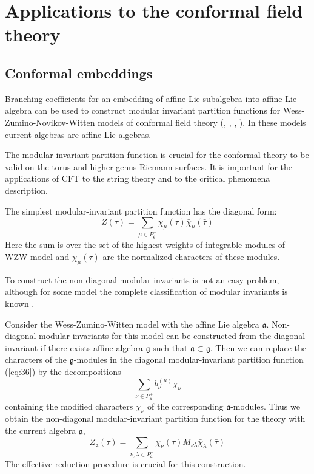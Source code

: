 \documentclass[a4paper,12pt]{article}
\theoremstyle{definition} \newtheorem{Def}{Definition}
\begin{document}
\section{Applications to the conformal field theory}
\label{sec:phys-appl}

\subsection{Conformal embeddings}
\label{sec:conformal-embeddings}

Branching coefficients for an embedding of affine Lie subalgebra into
affine Lie algebra can be used to construct modular invariant
partition functions for Wess-Zumino-Novikov-Witten models of conformal field theory (\cite{difrancesco1997cft}, \cite{Walton:1999xc}, \cite{walton1989conformal}, \cite{schellekens1986conformal}). In these models current algebras are affine Lie algebras.

The modular invariant partition function is crucial for the conformal theory to be valid on the torus and higher genus Riemann surfaces. It is important for the applications of CFT to the string theory and to the critical phenomena description. 

The simplest modular-invariant partition function has the diagonal form:
\begin{equation}
  \label{eq:34}
   Z(\tau)=\sum_{ \mu\in P^{+}_{\mathfrak{g}}} \chi_{\mu}(\tau)\bar \chi_{\mu}(\bar \tau)
\end{equation}
Here the sum is over the set of the highest weights of integrable modules of WZW-model and $\chi_{\mu}(\tau)$ are the normalized characters of these modules. 

To construct the non-diagonal modular invariants is not an easy problem, although for some model the complete classification of modular invariants is known \cite{1994hepthGannon,1995JMPGannon}.

Consider the Wess-Zumino-Witten model with the affine Lie algebra $\mathfrak{a}$. Non-diagonal modular invariants for this model can be constructed from the diagonal invariant if there exists affine algebra $\mathfrak{g}$ such that $\mathfrak{a}\subset\mathfrak{g}$. 
Then we can replace the characters of the $\mathfrak{g}$-modules in the diagonal modular-invariant partition function (\ref{eq:36})
by the decompositions
\begin{equation}
  \label{eq:32}
\sum_{\nu \in P^{+}_{\mathfrak{a}}}b^{(\mu)}_{\nu} \chi_{\nu}  
\end{equation}
containing the modified characters $\chi_{\nu}$ of the corresponding $\mathfrak{a}$-modules. Thus we obtain the non-diagonal modular-invariant  partition function for the theory with the current algebra $\mathfrak{a}$,
\begin{equation}
  \label{eq:36}
   Z_{\mathfrak{a}}(\tau)=\sum_{ \nu,\lambda\in P^{+}_{\mathfrak{a}}} \chi_{\nu}(\tau)M_{\nu\lambda}\bar \chi_{\lambda}(\bar \tau)
\end{equation}
The effective reduction procedure is crucial for this construction.
\end{document}
